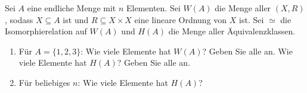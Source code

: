 
\begin{exercise}[281]

Sei $A$ eine endliche Menge mit $n$ Elementen. Sei $W(A)$ die Menge aller $(X,R)$,
sodass $X \subseteq A$ ist und $R \subseteq X \times X$ eine lineare Ordnung von $X$
ist. Sei $\simeq$ die Isomorphierelation auf $W(A)$ und $H(A)$ die Menge aller
Äquivalenzklassen.

\begin{enumerate}[label = \alph*.]
  \item Für $A = \{1,2,3\}$: Wie viele Elemente hat $W(A)$? Geben Sie alle an.
  Wie viele Elemente hat $H(A)$? Geben Sie alle an.
  \item Für beliebiges $n$: Wie viele Elemente hat $H(A)$?
\end{enumerate}

\end{exercise}


\begin{solution}

\phantom{}

\end{solution}

